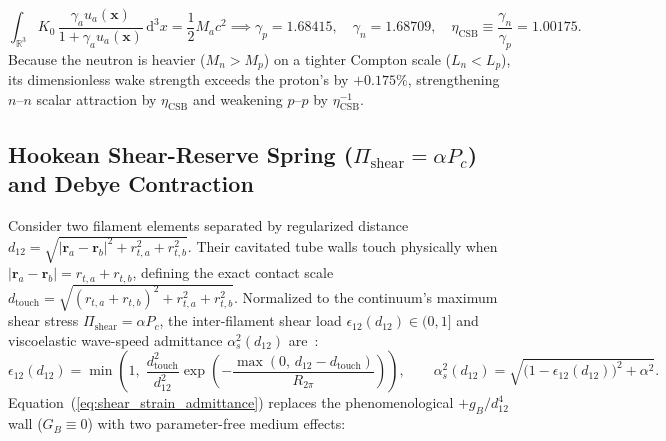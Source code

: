 \documentclass[11pt, a4paper]{article}
\DeclareRobustCommand{\dd}{\mathrm{d}}
\DeclareRobustCommand{\dtouch}{d_{\mathrm{touch}}}
\begin{document}
\begin{equation}
    \int_{\mathbb{R}^3} K_0\,\frac{\gamma_a u_a(\mathbf{x})}{1 + \gamma_a u_a(\mathbf{x})}\,\dd^3x = \frac{1}{2}M_a c^2 \implies
    \gamma_p = 1.68415,\quad \gamma_n = 1.68709,\quad \eta_{\mathrm{CSB}} \equiv \frac{\gamma_n}{\gamma_p} = \mathbf{1.00175}.
    \label{eq:virial_csb_ratio}
\end{equation}
Because the neutron is heavier ($M_n > M_p$) on a tighter Compton scale ($L_n < L_p$), its dimensionless wake strength exceeds the proton's by $+0.175\%$, strengthening $n\text{--}n$ scalar attraction by $\eta_{\mathrm{CSB}}$ and weakening $p\text{--}p$ by $\eta_{\mathrm{CSB}}^{-1}$.

\subsection{\texorpdfstring{Hookean Shear-Reserve Spring ($\Pi_{\mathrm{shear}} = \alpha P_c$) and Debye Contraction}{Hookean Shear-Reserve Spring and Debye Contraction}}
Consider two filament elements separated by regularized distance $d_{12} = \sqrt{|\mathbf{r}_a - \mathbf{r}_b|^2 + r_{t,a}^2 + r_{t,b}^2}$. Their cavitated tube walls touch physically when $|\mathbf{r}_a - \mathbf{r}_b| = r_{t,a} + r_{t,b}$, defining the exact contact scale $\dtouch = \sqrt{(r_{t,a} + r_{t,b})^2 + r_{t,a}^2 + r_{t,b}^2}$. Normalized to the continuum's maximum shear stress $\Pi_{\mathrm{shear}} = \alpha P_c$, the inter-filament shear load $\epsilon_{12}(d_{12}) \in (0, 1]$ and viscoelastic wave-speed admittance $\alpha_s^2(d_{12})$ are~\cite{bairmosheh2026,bairmosheh2026b}:
\begin{equation}
    \epsilon_{12}(d_{12}) = \min\!\left(1,\; \frac{\dtouch^2}{d_{12}^2}\exp\!\left(-\frac{\max(0,\, d_{12} - \dtouch)}{R_{2\pi}}\right)\right), \qquad
    \alpha_s^2(d_{12}) = \sqrt{\big(1 - \epsilon_{12}(d_{12})\big)^2 + \alpha^2}.
    \label{eq:shear_strain_admittance}
\end{equation}
Equation~(\ref{eq:shear_strain_admittance}) replaces the phenomenological $+g_B/d_{12}^4$ wall ($G_B \equiv 0$) with two parameter-free medium effects:
\end{document}
